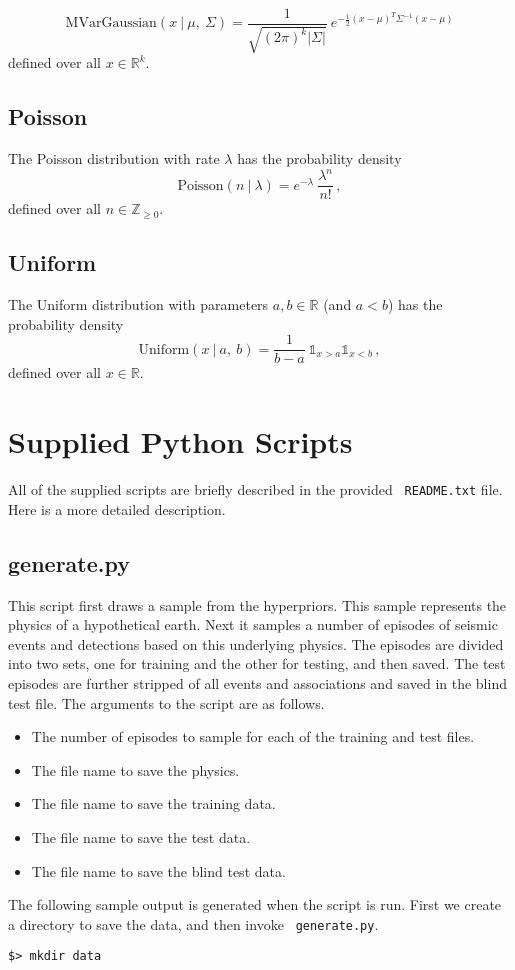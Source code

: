 \documentclass[12pt,letterpaper,onecolumn,oneside]{article}
\begin{document}
\begin{appendices}
\[\text{MVarGaussian}(x \ | \ \mu, \ \Sigma ) = 
\frac{1}{\sqrt{(2 \pi)^k | \Sigma
    |}} \ 
e^{ -\frac{1}{2} (x - \mu)^T \Sigma^{-1} (x - \mu)}
\]
defined over all $x \in \mathbb{R}^k$.

\subsection{Poisson}

The Poisson distribution with rate $\lambda$ has the probability density
\[ \text{Poisson}(n \ | \ \lambda) =  e ^ {-\lambda}  \ 
\frac{  \lambda ^ n  }{n !} \,
, \]
defined over all $n \in \mathbb{Z}_{\ge 0}$.

\subsection{Uniform}

The Uniform distribution with parameters $a, b \in \mathbb{R}$ (and $a <
b$) has the probability density
\[ \text{Uniform}(x \ | \ a, \ b) = \frac{1}{b - a} \ \mathbb{1}_{x>a}
\mathbb{1}_{x<b}\, ,\]
defined over all $x \in \mathbb{R}$.

\section{Supplied Python Scripts}

All of the supplied scripts are briefly described in the provided {\tt
  README.txt} file. Here is a more detailed description.

\subsection{generate.py}

This script first draws a sample from the hyperpriors. This sample
represents the physics of a hypothetical earth.  Next it samples a
number of episodes of seismic events and detections based on this
underlying physics. The episodes are divided into two sets, one for
training and the other for testing, and then saved. The test episodes
are further stripped of all events and associations and saved in the
blind test file. The arguments to the script are as follows.
\begin{itemize}
\item The number of episodes to sample for each of the training and test
  files.
\item The file name to save the physics.
\item The file name to save the training data.
\item The file name to save the test data.
\item The file name to save the blind test data.
\end{itemize}
The following sample output is generated when the script is run. First
we create a directory to save the data, and then invoke {\tt
  generate.py}.
\begin{lstlisting}
$> mkdir data


\end{lstlisting}
\end{appendices}
\end{document}
